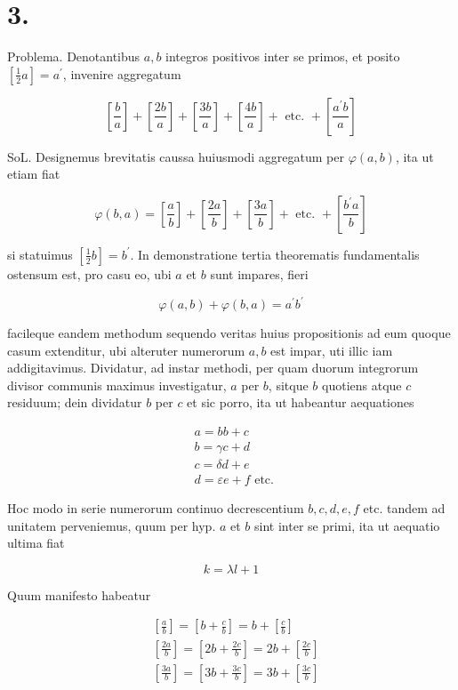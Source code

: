 \documentclass[10pt]{article}
\begin{document}
\section*{3.}
Problema. Denotantibus \(a, b\) integros positivos inter se primos, et posito \(\left[\frac{1}{2} a\right]=a^{\prime}\), invenire aggregatum

\[
\left[\frac{b}{a}\right]+\left[\frac{2 b}{a}\right]+\left[\frac{3 b}{a}\right]+\left[\frac{4 b}{a}\right]+\text { etc. }+\left[\frac{a^{\prime} b}{a}\right]
\]

SoL. Designemus brevitatis caussa huiusmodi aggregatum per \(\varphi(a, b)\), ita ut etiam fiat

\[
\varphi(b, a)=\left[\frac{a}{b}\right]+\left[\frac{2 a}{b}\right]+\left[\frac{3 a}{b}\right]+\text { etc. }+\left[\frac{b^{\prime} a}{b}\right]
\]

si statuimus \(\left[\frac{1}{2} b\right]=b^{\prime}\). In demonstratione tertia theorematis fundamentalis ostensum est, pro casu eo, ubi \(a\) et \(b\) sunt impares, fieri

\[
\varphi(a, b)+\varphi(b, a)=a^{\prime} b^{\prime}
\]

facileque eandem methodum sequendo veritas huius propositionis ad eum quoque casum extenditur, ubi alteruter numerorum \(a, b\) est impar, uti illic iam addigitavimus. Dividatur, ad instar methodi, per quam duorum integrorum divisor communis maximus investigatur, \(a\) per \(b\), sitque \(b\) quotiens atque \(c\) residuum; dein dividatur \(b\) per \(c\) et sic porro, ita ut habeantur aequationes

\[
\begin{aligned}
& a=b b+c \\
& b=\gamma c+d \\
& c=\delta d+e \\
& d=\varepsilon e+f \text { etc. }
\end{aligned}
\]

Hoc modo in serie numerorum continuo decrescentium \(b, c, d, e, f\) etc. tandem ad unitatem perveniemus, quum per hyp. \(a\) et \(b\) sint inter se primi, ita ut aequatio ultima fiat

\[
k=\lambda l+1
\]

Quum manifesto habeatur

\[
\begin{aligned}
& {\left[\frac{a}{b}\right]=\left[b+\frac{c}{b}\right]=b+\left[\frac{c}{b}\right]} \\
& {\left[\frac{2 a}{b}\right]=\left[2 b+\frac{2 c}{b}\right]=2 b+\left[\frac{2 c}{b}\right]} \\
& {\left[\frac{3 a}{b}\right]=\left[3 b+\frac{3 c}{b}\right]=3 b+\left[\frac{3 c}{b}\right]}
\end{aligned}
\]
\end{document}
